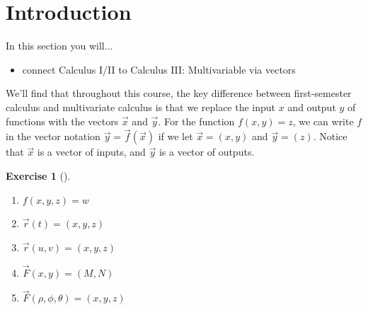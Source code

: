 \documentclass[10pt,]{book}
\theoremstyle{plain}
\theoremstyle{definition}
\theoremstyle{definition}
\theoremstyle{definition}
\theoremstyle{definition}
\newtheorem{exploration}[project]{Exercise}
\theoremstyle{definition}
\numberwithin{equation}{section}
\begin{document}
\section[{Introduction}]{Introduction}\label{section-20}
In this section you will... \leavevmode%
\begin{itemize}[label=\textbullet]
\item{}connect Calculus I/II to Calculus III: Multivariable via vectors%
\end{itemize}
%
\par
We'll find that throughout this course, the key difference between first-semester calculus and multivariate calculus is that we replace the input \(x\) and output \(y\) of functions with the vectors \(\vec x\) and \(\vec y\). For the function \(f(x,y)=z\), we can write \(f\) in the vector notation \(\vec y=\vec f(\vec x)\) if we let \(\vec x=(x,y)\) and \(\vec y=(z)\). Notice that \(\vec x\) is a vector of inputs, and \(\vec y\) is a vector of outputs.%
\begin{exploration}[]\label{exploration-130}
\leavevmode%
\begin{enumerate}[font=\bfseries,label=(\alph*),ref=\alph*]
\item\label{task-258} \(f(x,y,z)=w\)%
\item\label{task-259} \(\vec r(t)=(x,y,z)\)%
\item\label{task-260} \(\vec r(u,v)=(x,y,z)\)%
\item\label{task-261} \(\vec F(x,y)=(M,N)\)%
\item\label{task-262} \(\vec F(\rho,\phi,\theta)=(x,y,z)\)%
\end{enumerate}
\end{exploration}
\typeout{************************************************}
\typeout{************************************************}
\end{document}
